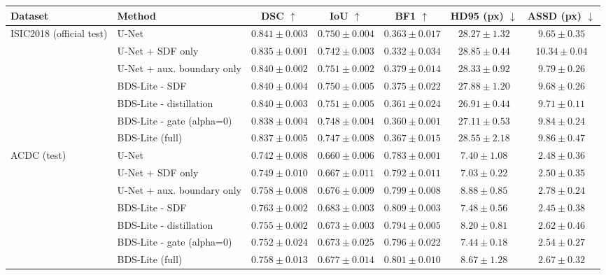 \begin{tabular}{llccccc}
\toprule
Dataset & Method & DSC $\uparrow$ & IoU $\uparrow$ & BF1 $\uparrow$ & HD95 (px) $\downarrow$ & ASSD (px) $\downarrow$ \\
\midrule
ISIC2018 (official test) & U-Net & $0.841 \pm 0.003$ & $0.750 \pm 0.004$ & $0.363 \pm 0.017$ & $28.27 \pm 1.32$ & $9.65 \pm 0.35$ \\
 & U-Net + SDF only & $0.835 \pm 0.001$ & $0.742 \pm 0.003$ & $0.332 \pm 0.034$ & $28.85 \pm 0.44$ & $10.34 \pm 0.04$ \\
 & U-Net + aux. boundary only & $0.840 \pm 0.002$ & $0.751 \pm 0.002$ & $0.379 \pm 0.014$ & $28.33 \pm 0.92$ & $9.79 \pm 0.26$ \\
 & BDS-Lite - SDF & $0.840 \pm 0.004$ & $0.750 \pm 0.005$ & $0.375 \pm 0.022$ & $27.88 \pm 1.20$ & $9.68 \pm 0.26$ \\
 & BDS-Lite - distillation & $0.840 \pm 0.003$ & $0.751 \pm 0.005$ & $0.361 \pm 0.024$ & $26.91 \pm 0.44$ & $9.71 \pm 0.11$ \\
 & BDS-Lite - gate (alpha=0) & $0.838 \pm 0.004$ & $0.748 \pm 0.004$ & $0.360 \pm 0.001$ & $27.11 \pm 0.53$ & $9.84 \pm 0.24$ \\
 & BDS-Lite (full) & $0.837 \pm 0.005$ & $0.747 \pm 0.008$ & $0.367 \pm 0.015$ & $28.55 \pm 2.18$ & $9.86 \pm 0.47$ \\
\midrule
ACDC (test) & U-Net & $0.742 \pm 0.008$ & $0.660 \pm 0.006$ & $0.783 \pm 0.001$ & $7.40 \pm 1.08$ & $2.48 \pm 0.36$ \\
 & U-Net + SDF only & $0.749 \pm 0.010$ & $0.667 \pm 0.011$ & $0.792 \pm 0.011$ & $7.03 \pm 0.22$ & $2.50 \pm 0.35$ \\
 & U-Net + aux. boundary only & $0.758 \pm 0.008$ & $0.676 \pm 0.009$ & $0.799 \pm 0.008$ & $8.88 \pm 0.85$ & $2.78 \pm 0.24$ \\
 & BDS-Lite - SDF & $0.763 \pm 0.002$ & $0.683 \pm 0.003$ & $0.809 \pm 0.003$ & $7.48 \pm 0.56$ & $2.45 \pm 0.38$ \\
 & BDS-Lite - distillation & $0.755 \pm 0.002$ & $0.673 \pm 0.003$ & $0.794 \pm 0.005$ & $8.20 \pm 0.81$ & $2.62 \pm 0.46$ \\
 & BDS-Lite - gate (alpha=0) & $0.752 \pm 0.024$ & $0.673 \pm 0.025$ & $0.796 \pm 0.022$ & $7.44 \pm 0.18$ & $2.54 \pm 0.27$ \\
 & BDS-Lite (full) & $0.758 \pm 0.013$ & $0.677 \pm 0.014$ & $0.801 \pm 0.010$ & $8.67 \pm 1.28$ & $2.67 \pm 0.32$ \\

\end{tabular}
